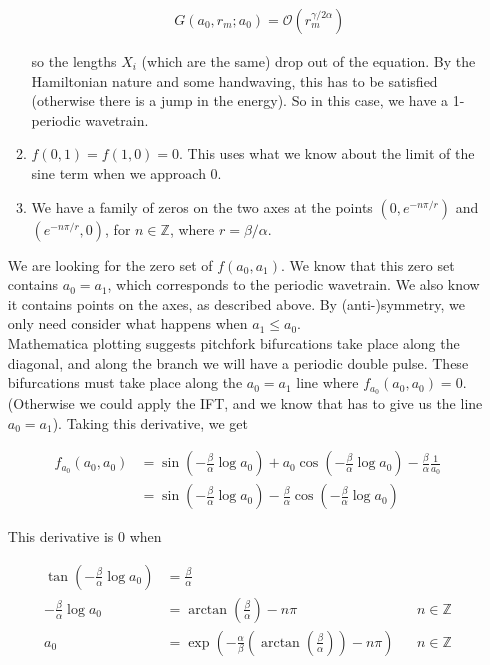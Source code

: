 \documentclass[12pt]{article}
\def\Z{{\mathbb Z}}
\begin{document}
\begin{enumerate}
\begin{enumerate}
	\begin{align*}
	G(a_0, r_m; a_0) = \mathcal{O}(r_m^{\gamma / 2 \alpha})
	\end{align*}

	so the lengths $X_i$ (which are the same) drop out of the equation. By the Hamiltonian nature and some handwaving, this has to be satisfied (otherwise there is a jump in the energy). So in this case, we have a 1-periodic wavetrain.

	\item $f(0, 1) = f(1, 0) = 0$. This uses what we know about the limit of the sine term when we approach 0.

   \item We have a family of zeros on the two axes at the points $(0, e^{-n \pi/r})$ and $(e^{-n \pi/r}, 0)$, for $n \in \Z$, where $r = \beta/\alpha$.

\end{enumerate}

We are looking for the zero set of $f(a_0, a_1)$. We know that this zero set contains $a_0 = a_1$, which corresponds to the periodic wavetrain. We also know it contains points on the axes, as described above. By (anti-)symmetry, we only need consider what happens when $a_1 \leq a_0$.\\

Mathematica plotting suggests pitchfork bifurcations take place along the diagonal, and along the branch we will have a periodic double pulse. These bifurcations must take place along the $a_0 = a_1$ line where $f_{a_0}(a_0, a_0) = 0$. (Otherwise we could apply the IFT, and we know that has to give us the line $a_0 = a_1$). Taking this derivative, we get

\begin{align*}
f_{a_0}(a_0, a_0) &= 
\sin \left( - \frac{\beta}{\alpha} \log a_0 \right)
+ a_0 \cos \left( - \frac{\beta}{\alpha} \log a_0 \right)- \frac{\beta}{\alpha} \frac{1}{a_0} \\
&= \sin \left( - \frac{\beta}{\alpha} \log a_0 \right) - \frac{\beta}{\alpha} \cos \left( - \frac{\beta}{\alpha} \log a_0 \right)
\end{align*}

This derivative is 0 when

\begin{align*}
\tan \left( -\frac{\beta}{\alpha} \log a_0 \right) &=  \frac{\beta}{\alpha} \\
-\frac{\beta}{\alpha} \log a_0 &= \arctan \left( \frac{\beta}{\alpha}\right) - n \pi && n \in \Z \\ 
a_0 &= \exp \left( -\frac{\alpha}{\beta} \left( \arctan \left( \frac{\beta}{\alpha}\right) \right) - n \pi \right) && n \in \Z
\end{align*}


\end{enumerate}
\end{document}
